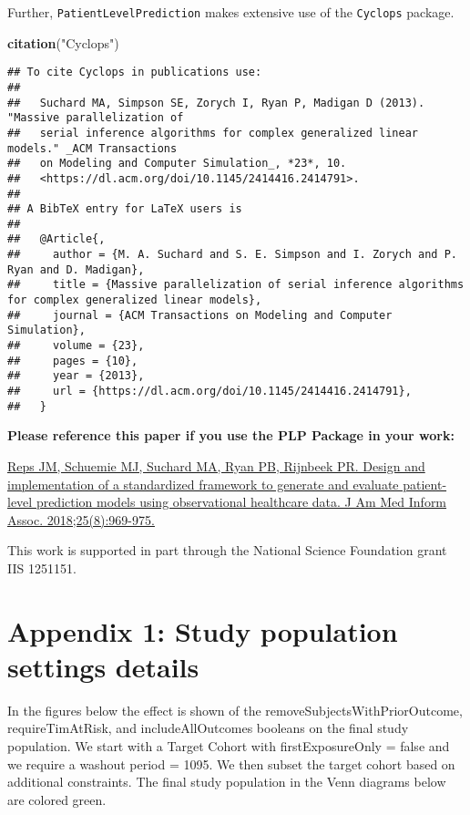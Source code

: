 \documentclass[
]{article}
\newenvironment{Shaded}{\begin{snugshade}}{\end{snugshade}}
\newcommand{\FunctionTok}[1]{\textcolor[rgb]{0.13,0.29,0.53}{\textbf{#1}}}
\newcommand{\NormalTok}[1]{#1}
\newcommand{\StringTok}[1]{\textcolor[rgb]{0.31,0.60,0.02}{#1}}
\begin{document}
Further, \texttt{PatientLevelPrediction} makes extensive use of the
\texttt{Cyclops} package.

\begin{Shaded}
\begin{Highlighting}[]
\FunctionTok{citation}\NormalTok{(}\StringTok{"Cyclops"}\NormalTok{)}
\end{Highlighting}
\end{Shaded}

\begin{verbatim}
## To cite Cyclops in publications use:
## 
##   Suchard MA, Simpson SE, Zorych I, Ryan P, Madigan D (2013). "Massive parallelization of
##   serial inference algorithms for complex generalized linear models." _ACM Transactions
##   on Modeling and Computer Simulation_, *23*, 10.
##   <https://dl.acm.org/doi/10.1145/2414416.2414791>.
## 
## A BibTeX entry for LaTeX users is
## 
##   @Article{,
##     author = {M. A. Suchard and S. E. Simpson and I. Zorych and P. Ryan and D. Madigan},
##     title = {Massive parallelization of serial inference algorithms for complex generalized linear models},
##     journal = {ACM Transactions on Modeling and Computer Simulation},
##     volume = {23},
##     pages = {10},
##     year = {2013},
##     url = {https://dl.acm.org/doi/10.1145/2414416.2414791},
##   }
\end{verbatim}

\textbf{Please reference this paper if you use the PLP Package in your
work:}

\href{http://dx.doi.org/10.1093/jamia/ocy032}{Reps JM, Schuemie MJ,
Suchard MA, Ryan PB, Rijnbeek PR. Design and implementation of a
standardized framework to generate and evaluate patient-level prediction
models using observational healthcare data. J Am Med Inform Assoc.
2018;25(8):969-975.}

This work is supported in part through the National Science Foundation
grant IIS 1251151.

\newpage

\hypertarget{appendix-1-study-population-settings-details}{%
\section*{Appendix 1: Study population settings
details}\label{appendix-1-study-population-settings-details}}

In the figures below the effect is shown of the
removeSubjectsWithPriorOutcome, requireTimAtRisk, and includeAllOutcomes
booleans on the final study population. We start with a Target Cohort
with firstExposureOnly = false and we require a washout period = 1095.
We then subset the target cohort based on additional constraints. The
final study population in the Venn diagrams below are colored green.
\end{document}
